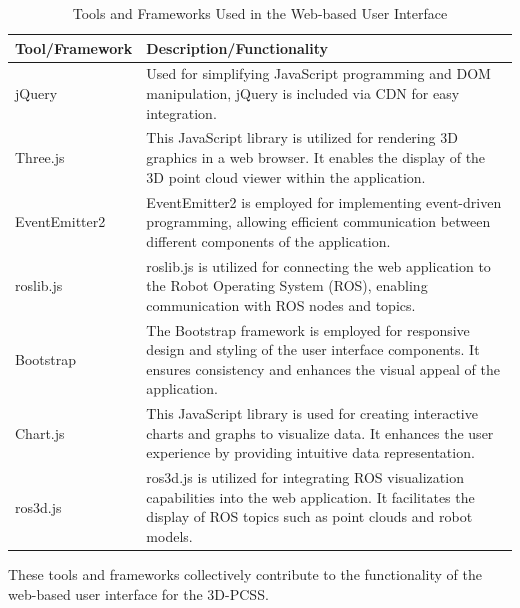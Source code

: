 \begin{table}[H]
	\centering
	\caption{Tools and Frameworks Used in the Web-based User Interface}
	\label{ch3:tab:tools-frameworks}
	\begin{tabular}{|l|p{9cm}|}
		\hline
		\textbf{Tool/Framework} & \textbf{Description/Functionality}                                                                                                                                                \\ \hline
		jQuery                  & Used for simplifying JavaScript programming and DOM manipulation, jQuery is included via CDN for easy integration.                                                                \\ \hline
		Three.js                & This JavaScript library is utilized for rendering 3D graphics in a web browser. It enables the display of the 3D point cloud viewer within the application.                       \\ \hline
		EventEmitter2           & EventEmitter2 is employed for implementing event-driven programming, allowing efficient communication between different components of the application.                            \\ \hline
		roslib.js               & roslib.js is utilized for connecting the web application to the Robot Operating System (ROS), enabling communication with ROS nodes and topics.                                   \\ \hline
		Bootstrap               & The Bootstrap framework is employed for responsive design and styling of the user interface components. It ensures consistency and enhances the visual appeal of the application. \\ \hline
		Chart.js                & This JavaScript library is used for creating interactive charts and graphs to visualize data. It enhances the user experience by providing intuitive data representation.         \\ \hline
		ros3d.js                & ros3d.js is utilized for integrating ROS visualization capabilities into the web application. It facilitates the display of ROS topics such as point clouds and robot models.     \\ \hline
	\end{tabular}
\end{table}


These tools and frameworks collectively contribute to the functionality of the web-based user interface for the 3D-PCSS.